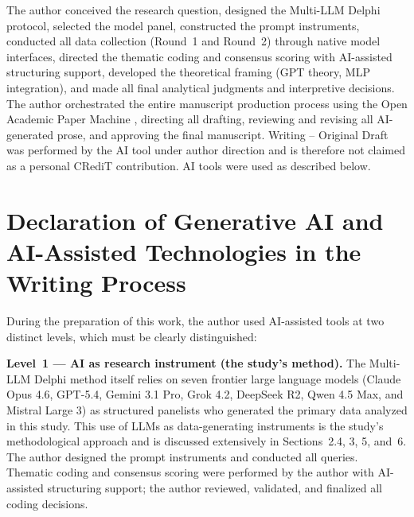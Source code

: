 \documentclass[preprint,review,12pt]{elsarticle}
\begin{document}
The author conceived the research question, designed the Multi-LLM Delphi protocol, selected the model panel, constructed the prompt instruments, conducted all data collection (Round~1 and Round~2) through native model interfaces, directed the thematic coding and consensus scoring with AI-assisted structuring support, developed the theoretical framing (GPT theory, MLP integration), and made all final analytical judgments and interpretive decisions. The author orchestrated the entire manuscript production process using the Open Academic Paper Machine \citep{blask2026openpapermachine}, directing all drafting, reviewing and revising all AI-generated prose, and approving the final manuscript. Writing -- Original Draft was performed by the AI tool under author direction and is therefore not claimed as a personal CRediT contribution. AI tools were used as described below.

\section*{Declaration of Generative AI and AI-Assisted Technologies in the Writing Process}

During the preparation of this work, the author used AI-assisted tools at two distinct levels, which must be clearly distinguished:

\textbf{Level~1 --- AI as research instrument (the study's method).} The Multi-LLM Delphi method itself relies on seven frontier large language models (Claude Opus 4.6, GPT-5.4, Gemini 3.1 Pro, Grok 4.2, DeepSeek R2, Qwen 4.5 Max, and Mistral Large 3) as structured panelists who generated the primary data analyzed in this study. This use of LLMs as data-generating instruments is the study's methodological approach and is discussed extensively in Sections~2.4, 3, 5, and~6. The author designed the prompt instruments and conducted all queries. Thematic coding and consensus scoring were performed by the author with AI-assisted structuring support; the author reviewed, validated, and finalized all coding decisions.
\end{document}
